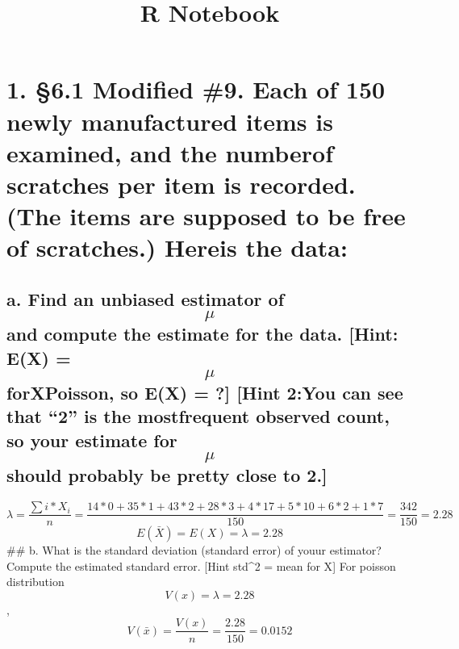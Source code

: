 \documentclass[
]{article}
\title{R Notebook}
\author{}
\date{\vspace{-2.5em}}
\begin{document}
\maketitle

\hypertarget{modified-9.-each-of-150-newly-manufactured-items-is-examined-and-the-numberof-scratches-per-item-is-recorded.-the-items-are-supposed-to-be-free-of-scratches.-hereis-the-data}{%
\section{1. §6.1 Modified \#9. Each of 150 newly manufactured items is
examined, and the numberof scratches per item is recorded. (The items
are supposed to be free of scratches.) Hereis the
data:}\label{modified-9.-each-of-150-newly-manufactured-items-is-examined-and-the-numberof-scratches-per-item-is-recorded.-the-items-are-supposed-to-be-free-of-scratches.-hereis-the-data}}

\hypertarget{a.-find-an-unbiased-estimator-of-mu-and-compute-the-estimate-for-the-data.-hint-ex-mu-forxpoisson-so-ex-hint-2you-can-see-that-2-is-the-mostfrequent-observed-count-so-your-estimate-formu-should-probably-be-pretty-close-to-2.}{%
\subsection{\texorpdfstring{a. Find an unbiased estimator of \[\mu\] and
compute the estimate for the data. {[}Hint: E(X) =\[\mu\] forXPoisson,
so E(X) = ?{]} {[}Hint 2:You can see that ``2'' is the mostfrequent
observed count, so your estimate for\[\mu\] should probably be pretty
close to
2.{]}}{a. Find an unbiased estimator of \textbackslash mu and compute the estimate for the data. {[}Hint: E(X) =\textbackslash mu forXPoisson, so E(X) = ?{]} {[}Hint 2:You can see that ``2'' is the mostfrequent observed count, so your estimate for\textbackslash mu should probably be pretty close to 2.{]}}}\label{a.-find-an-unbiased-estimator-of-mu-and-compute-the-estimate-for-the-data.-hint-ex-mu-forxpoisson-so-ex-hint-2you-can-see-that-2-is-the-mostfrequent-observed-count-so-your-estimate-formu-should-probably-be-pretty-close-to-2.}}

\[
\lambda = \frac{\sum i*X_i}{n} = \frac{14*0+35*1+43*2+28*3+4*17+5*10+6*2+1*7}{150} = \frac{342}{150} = 2.28
\] \[
E(\bar{X})=E(X) = \lambda=2.28
\] \#\# b. What is the standard deviation (standard error) of youur
estimator? Compute the estimated standard error. {[}Hint std\^{}2 = mean
for X{]} For poisson distribution \[V(x) = \lambda = 2.28\],
\[V(\bar{x}) = \frac{V(x)}{n} = \frac{2.28}{150} = 0.0152\]
\end{document}
